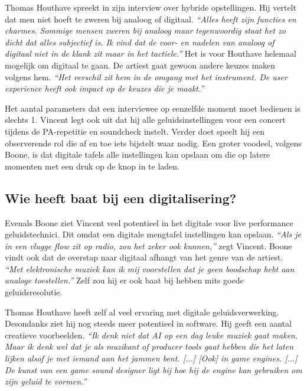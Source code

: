 Thomas Houthave spreekt in zijn interview over hybride opstellingen. \autocite{thomashouthave} Hij vertelt dat men niet hoeft te zweren bij analoog of digitaal. \textit{``Alles heeft zijn functies en charmes. Sommige mensen zweren bij analoog maar tegenwoordig staat het zo dicht dat alles subjectief is. Ik vind dat de voor- en nadelen van analoog of digitaal niet in de klank zit maar in het tactiele.''} \autocite{thomashouthave} Het is voor Houthave helemaal mogelijk om digitaal te gaan. De artiest gaat gewoon andere keuzes maken volgens hem. \textit{``Het verschil zit hem in de omgang met het instrument. De user experience heeft ook impact op de keuzes die je maakt.''}

Het aantal parameters dat een interviewee op eenzelfde moment moet bedienen is slechts 1. \autocite{vagabundos} Vincent legt ook uit dat hij alle geluidsinstellingen voor een concert tijdens de PA-repetitie en soundcheck instelt. Verder doet speelt hij een observerende rol die af en toe iets bijstelt waar nodig. Een groter voodeel, volgens Boone, is dat digitale tafels alle instellingen kan opslaan om die op latere momenten met een druk op de knop in te laden.

\subsection{Wie heeft baat bij een digitalisering?}

Evenals Boone ziet Vincent veel potentieel in het digitale voor live performance geluidstechnici. Dit omdat een digitale mengtafel instellingen kan opslaan. \textit{``Als je in een vlugge flow zit op radio, zou het zeker ook kunnen,''} zegt Vincent. \autocite{bartvincent}\newline Boone vindt ook dat de overstap naar digitaal afhangt van het genre van de artiest. \textit{``Met elektronische muziek kan ik mij voorstellen dat je geen boodschap hebt aan analoge toestellen.''} \autocite{peterboone} Zelf zou hij er ook baat bij hebben mits goede geluidsresolutie.

Thomas Houthave heeft zelf al veel ervaring met digitale geluidsverwerking. Desondanks ziet hij nog steeds meer potentieel in software. Hij geeft een aantal creatieve voorbeelden. \textit{``Ik denk niet dat AI op een dag leuke muziek gaat maken. Maar ik denk wel dat je als muzikant of producer tools gaat hebben die het laten lijken alsof je met iemand aan het jammen bent. [...] [Ook] in game engines. [...] De kunst van een game sound designer ligt bij hoe hij de engine kan gebruiken om zijn geluid te vormen.''} \autocite{thomashouthave}

